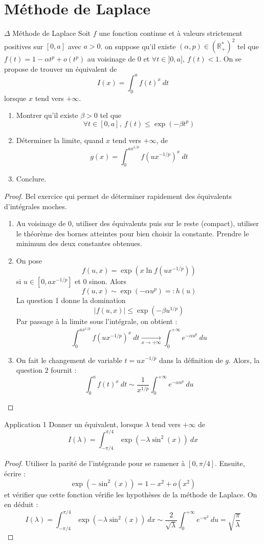 \documentclass[french,a4paper]{article}
\newcommand{\R}{\mathbb{R}}
\newcommand{\st}{^*}
\theoremstyle{plain}
\theoremstyle{definition}
\theoremstyle{remark}
\begin{document}
\section{Méthode de Laplace}

\begin{ex}[Moulin.IP.35]{$\Delta$ Méthode de Laplace}
	Soit $f$ une fonction continue et à valeurs strictement positives sur $[0,a]$ avec $a>0$. on suppose qu'il existe $(\alpha,p)\in(\R_+\st)^2$ tel que $f(t)=1-\alpha t^p+o(t^p)$ au voisinage de $0$ et $\forall t\in]0,a],\ f(t)<1$. On se propose de trouver un équivalent de $$I(x)=\int_{0}^{a}f(t)^x\ dt$$ lorsque $x$ tend vers $+\infty$.
	\begin{enumerate}
		\item Montrer qu'il existe $\beta>0$ tel que $$\forall t\in[0,a],\ f(t)\leqslant\exp(-\beta t^p)$$
		\item Déterminer la limite, quand $x$ tend vers $+\infty$, de $$g(x)=\int_{0}^{ax^{1/p}}f\left(ux^{-1/p}\right)^x\ dt$$
		\item Conclure.
	\end{enumerate}
\end{ex}
\begin{proof}
	Bel exercice qui permet de déterminer rapidement des équivalents d'intégrales moches.
	\begin{enumerate}
		\item Au voisinage de $0$, utiliser des équivalents puis sur le reste (compact), utiliser le théorème des bornes atteintes pour bien choisir la constante. Prendre le minimum des deux constantes obtenues.
		\item On pose $$f(u,x)=\exp\left(x\ln f\left(ux^{-1/p}\right)\right)$$ si $u\in[0,ax^{-1/p}]$ et $0$ sinon. Alors $$f(u,x)\sim \exp(-\alpha u^p)=:h(u)$$ La question 1 donne la domination $$\lvert f(u,x)\rvert\leqslant\exp(-\beta u^{1/p})$$ Par passage à la limite sous l'intégrale, on obtient : $$\int_{0}^{ax^{1/p}}f\left(ux^{-1/p}\right)^x\ dt\xrightarrow[x\to+\infty]{}\int_{0}^{+\infty}e^{-\alpha u^p}\ du$$
		\item On fait le changement de variable $t=ux^{-1/p}$ dans la définition de $g$. Alors, la question $2$ fournit : $$\int_{0}^{a}f(t)^x\ dt\sim \frac{1}{x^{1/p}}\int_{0}^{+\infty}e^{-\alpha u^p}\ du$$
	\end{enumerate}
\end{proof}

\begin{ex}[Moulin.IP.36]{Application 1}
	Donner un équivalent, lorsque $\lambda$ tend vers $+\infty$ de $$I(\lambda)=\int_{-\pi/4}^{\pi/4}\exp(-\lambda\sin^2(x))\ dx$$
\end{ex}
\begin{proof}
	Utiliser la parité de l'intégrande pour se ramener à $[0,\pi/4]$. Ensuite, écrire : $$\exp(-\sin^2(x))=1-x^2+o(x^2)$$ et vérifier que cette fonction vérifie les hypothèses de la méthode de Laplace. On en déduit : $$I(\lambda)=\int_{-\pi/4}^{\pi/4}\exp(-\lambda\sin^2(x))\ dx\sim\frac{2}{\sqrt{\lambda}}\int_{0}^{+\infty}e^{-u^2}\ du=\sqrt{\frac{\pi}{\lambda}}$$
\end{proof}
\end{document}

